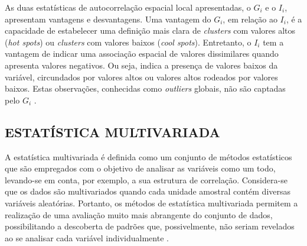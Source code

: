 \documentclass[
	12pt,				%
	openright,			%
	oneside,			%
	a4paper,			%
	chapter=TITLE,		%
	section=TITLE,		%
	english,			%
	french,				%
	spanish,			%
	brazil				%
	]{abntex2}
\begin{document}
 


As duas estatísticas de autocorrelação espacial local apresentadas, o $G_i$ e o $I_i$, apresentam vantagens e desvantagens. Uma vantagem do $G_i$, em relação ao $I_i$, é a capacidade de estabelecer uma definição mais clara de \textit{clusters} com valores altos  (\textit{hot spots}) ou \textit{clusters} com valores baixos (\textit{cool spots}). Entretanto, o $I_i$ tem a vantagem de indicar uma associação espacial de valores dissimilares quando apresenta valores negativos. Ou seja, indica a presença de valores baixos da variável, circundados por valores altos ou valores altos rodeados por valores baixos. Estas observações, conhecidas como \textit{outliers} globais, não são captadas pelo $G_i$ \cite{darmofal06}.

\subsection{ESTATÍSTICA MULTIVARIADA}


A estatística multivariada é definida como um conjunto de métodos estatísticos que são empregados com o objetivo de analisar as variáveis como um todo, levando-se em conta, por exemplo, a sua estrutura de correlação. Considera-se que os dados são multivariados quando cada unidade amostral contém diversas variáveis aleatórias. Portanto, os métodos de estatística multivariada permitem a realização de uma avaliação muito mais abrangente do conjunto de dados, possibilitando a descoberta de padrões que, possivelmente, não seriam revelados ao se analisar cada variável individualmente \cite{mingoti10}.
\end{document}
